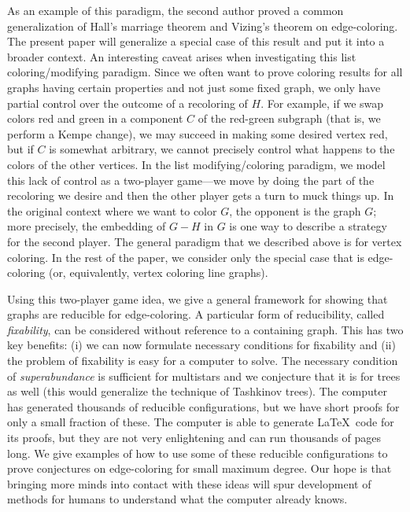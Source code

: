 \documentclass[12pt]{article}
\theoremstyle{plain}
\theoremstyle{definition}
\theoremstyle{remark}
\begin{document}
As an example of this paradigm,
the second author proved \cite{HallGame} 
a common generalization of Hall's marriage theorem and Vizing's theorem on
edge-coloring.  The present paper will generalize a
special case of this result and put it into a broader context.  An interesting
caveat arises when investigating this list coloring/modifying paradigm. 
Since we often want to prove coloring results for all graphs having
certain properties and not just some fixed graph, we only have partial control
over the outcome of a recoloring of $H$. For example, if we swap colors red and
green in a component $C$ of the red-green subgraph (that is, we perform a Kempe
change), we may succeed in making some desired vertex red,
but if $C$ is somewhat arbitrary, we cannot precisely control what happens
to the colors of the other vertices.  In the list modifying/coloring paradigm,
we model this lack of control as a two-player game---we move by doing the part
of the recoloring we desire and then the other player gets a turn to muck things up. 
In the original context where we want to color $G$, the opponent is the graph
$G$; more precisely, the embedding of $G-H$ in $G$ is one way to describe a
strategy for the second player. The general paradigm that we described above is for vertex coloring.  In the
rest of the paper, we consider only the special case that is edge-coloring (or,
equivalently, vertex coloring line graphs).  

Using this two-player game idea, we give a general framework for showing that graphs are reducible for edge-coloring.  A particular form of reducibility, called \emph{fixability}, can be considered without reference to a containing graph.  This has two key benefits: (i) we can now formulate necessary conditions for fixability and (ii) the problem of fixability is easy for a computer to solve. The necessary condition of \emph{superabundance} is sufficient for multistars and we conjecture that it is for trees as well (this would generalize the technique of Tashkinov trees). The computer has generated thousands of reducible configurations, but we have short proofs for only a small fraction of these.  The computer is able to generate \LaTeX\ code for its proofs, but they are not very enlightening and can run thousands of pages long.  We give examples of how to use some of these reducible configurations to prove conjectures on edge-coloring for small maximum degree.  Our hope is that bringing more minds into contact with these ideas will spur development of methods for humans to understand what the computer already knows.
\end{document}
